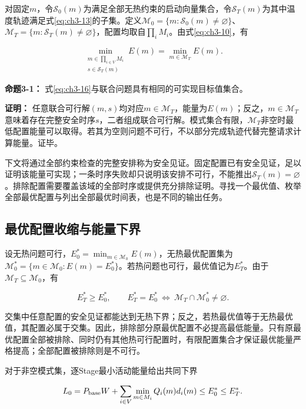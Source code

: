 对固定\(m\)，令\(\mathcal S_0(m)\)为满足全部无热约束的启动向量集合，令\(\mathcal S_T(m)\)为其中温度轨迹满足式\eqref{eq:ch3-13}的子集。定义\(\mathcal M_0=\{m:\mathcal S_0(m)\ne\varnothing\}\)、\(\mathcal M_T=\{m:\mathcal S_T(m)\ne\varnothing\}\)，配置均取自\(\prod_iM_i\)。由式\eqref{eq:ch3-10}，有

\begin{equation}
\boxed{\min_{\substack{m\in\prod_{i\in V}M_i\\s\in\mathcal S_T(m)}}E(m)
=\min_{m\in\mathcal M_T}E(m).}
\label{eq:ch3-16}
\end{equation}

\textbf{命题3-1：} 式\eqref{eq:ch3-16}与联合问题具有相同的可实现目标值集合。

\textbf{证明：} 任意联合可行解\((m,s)\)均对应\(m\in\mathcal M_T\)，能量为\(E(m)\)；反之，\(m\in\mathcal M_T\)意味着存在完整安全时序\(s\)，二者组成联合可行解。模式集合有限，\(\mathcal M_T\)非空时最低配置能量可以取得。若其为空则问题不可行，不以部分完成轨迹代替完整请求计算能量。证毕。

下文将通过全部约束检查的完整安排称为安全见证。固定配置已有安全见证，足以证明该能量可实现；一条时序失败却只说明该安排不可行，不能推出\(\mathcal S_T(m)=\varnothing\)。排除配置需要覆盖该域的全部时序或提供充分排除证明。寻找一个最优值、枚举全部最优配置与列出全部最优时间表，也是不同的输出任务。

\subsection{最优配置收缩与能量下界}

设无热问题可行，\(E_0^*=\min_{m\in\mathcal M_0}E(m)\)，无热最优配置集为\(\mathcal M_0^*=\{m\in\mathcal M_0:E(m)=E_0^*\}\)。若热问题也可行，最优值记为\(E_T^*\)。由于\(\mathcal M_T\subseteq\mathcal M_0\)，有

\begin{equation}
E_T^*\ge E_0^*,\qquad
E_T^*=E_0^*\ \Longleftrightarrow\ \mathcal M_T\cap\mathcal M_0^*\ne\varnothing.
\label{eq:ch3-17}
\end{equation}

交集中任意配置的安全见证都能达到无热下界；反之，若热最优值等于无热最优值，其配置必属于交集。因此，排除部分原最优配置不必提高最低能量。只有原最优配置全部被排除、同时仍有其他热可行配置时，有限配置集合才保证最优能量严格提高；全部配置被排除则是不可行。

对于非空模式集，逐Stage最小活动能量给出共同下界

\begin{equation}
L_0=P_{\rm base}W+\sum_{i\in V}\min_{m\in M_i}Q_i(m)d_i(m)
\le E_0^*\le E_T^*.
\label{eq:ch3-18}
\end{equation}

